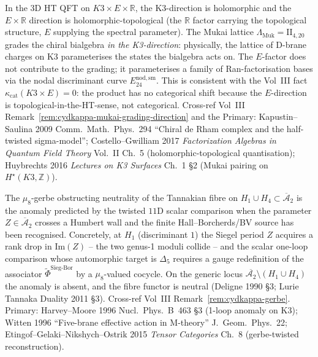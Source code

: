 \begin{remark}
\label{rem:htpo-mukai-direction}
In the 3D HT QFT on $K3\times E\times \mathbb{R}$, the K3-direction
is holomorphic and the $E\times \mathbb{R}$ direction is
holomorphic-topological (the $\mathbb{R}$ factor carrying the
topological structure, $E$ supplying the spectral parameter). The
Mukai lattice $\Lambda_{\mathrm{Muk}} = \mathrm{II}_{4,20}$ grades
the chiral bialgebra \emph{in the K3-direction}: physically, the
lattice of D-brane charges on K3 parameterises the states the
bialgebra acts on. The $E$-factor does not contribute to the
grading; it parameterises a family of Ran-factorisation bases via
the nodal discriminant curve $E^{\mathrm{nod,sm}}_{24}$. This is
consistent with the Vol~III fact
$\kappa_{\mathrm{cat}}(K3\times E) = 0$: the product has no
categorical shift because the $E$-direction is topological-in-the-HT-sense,
not categorical. Cross-ref Vol~III
Remark~\ref{rem:cydkappa-mukai-grading-direction} and the
Primary:
Kapustin--Saulina 2009 Comm.~Math.~Phys.~294 ``Chiral de Rham complex
and the half-twisted sigma-model''; Costello--Gwilliam 2017
\emph{Factorization Algebras in Quantum Field Theory} Vol.~II Ch.~5
(holomorphic-topological quantisation); Huybrechts 2016
\emph{Lectures on K3 Surfaces} Ch.~1 \S2 (Mukai pairing on
$H^\star(K3,\mathbb Z)$).
\end{remark}

\begin{remark}
\label{rem:htpo-gerbe-physical}
The $\mu_8$-gerbe obstructing neutrality of the Tannakian fibre on
$H_1 \cup H_4 \subset \overline{\mathcal A}_2$ is the anomaly predicted
by the twisted $11$D scalar comparison when the parameter
$Z\in\overline{\mathcal A}_2$ crosses a Humbert wall and the
finite Hall--Borcherds/BV source has been recognised.
Concretely, at $H_1$ (discriminant $1$) the Siegel period $Z$
acquires a rank drop in $\mathrm{Im}(Z)$ -- the two genus-1 moduli
collide -- and the scalar one-loop comparison whose automorphic target
is $\Delta_5$ requires a gauge redefinition of the
associator $\widetilde{\Phi}^{\mathrm{Sieg\text{-}Bor}}$ by a
$\mu_8$-valued cocycle. On the generic locus
$\overline{\mathcal A_2}\setminus(H_1\cup H_4)$ the anomaly is
absent, and the fibre functor is neutral
(Deligne 1990 \S3; Lurie Tannaka Duality 2011 \S3).
Cross-ref Vol~III Remark~\ref{rem:cydkappa-gerbe}. Primary:
Harvey--Moore 1996 Nucl.~Phys.~B~463 \S3 (1-loop anomaly on K3);
Witten 1996 ``Five-brane effective action in M-theory'' J.~Geom.~Phys.~22;
Etingof--Gelaki--Nikshych--Ostrik 2015 \emph{Tensor Categories}
Ch.~8 (gerbe-twisted reconstruction).
\end{remark}

